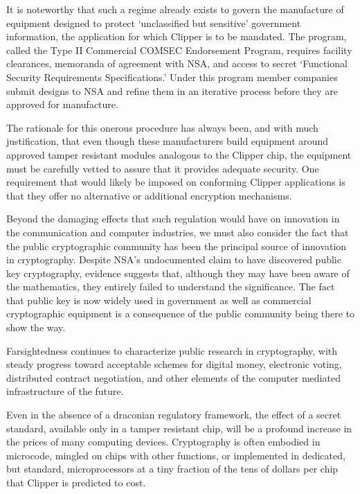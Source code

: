 \para It is noteworthy that such a regime already exists to govern
the manufacture of equipment designed to protect `unclassified but
sensitive' government information, the application for which Clipper
is to be mandated.  The program, called the Type II Commercial COMSEC
Endorsement Program, requires facility clearances, memoranda of
agreement with NSA, and access to secret `Functional Security
Requirements Specifications.'  Under this program member companies
submit designs to NSA and refine them in an iterative process before
they are approved for manufacture. \endpara

\para The rationale for this onerous procedure has always been, and
with much justification, that even though these manufacturers build
equipment around approved tamper resistant modules analogous to the
Clipper chip, the equipment must be carefully vetted to assure that
it provides adequate security.  One requirement that would likely be
imposed on conforming Clipper applications is that they offer no
alternative or additional encryption mechanisms. \endpara

\para Beyond the damaging effects that such regulation would have
on innovation in the communication and computer industries, we must
also consider the fact that the public cryptographic community has
been the principal source of innovation in cryptography.  Despite
NSA's undocumented claim to have discovered public key cryptography,
evidence suggests that, although they may have been aware of the
mathematics, they entirely failed to understand the significance.  The
fact that public key is now widely used in government as well as
commercial cryptographic equipment is a consequence of the public
community being there to show the way. \endpara

\para Farsightedness continues to characterize public research in
cryptography, with steady progress toward acceptable schemes for
digital money, electronic voting, distributed contract negotiation,
and other elements of the computer mediated infrastructure of the
future. \endpara

\para Even in the absence of a draconian regulatory framework, the
effect of a secret standard, available only in a tamper resistant
chip, will be a profound increase in the prices of many computing
devices.  Cryptography is often embodied in microcode, mingled on
chips with other functions, or implemented in dedicated, but standard,
microprocessors at a tiny fraction of the tens of dollars per chip
that Clipper is predicted to cost. \endpara

